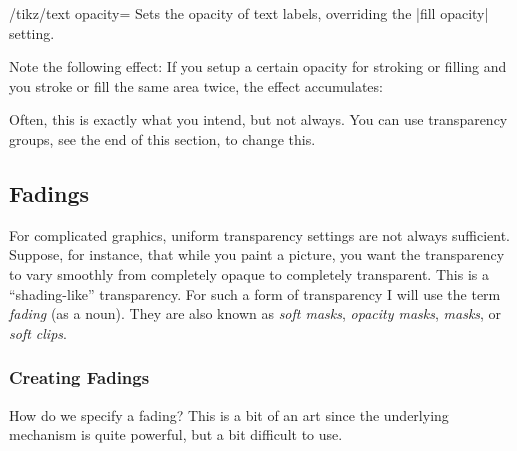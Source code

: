 \begin{key}{/tikz/text opacity=}
  Sets the opacity of text labels, overriding the |fill opacity| setting. 
\begin{codeexample}[]
\end{codeexample}
\end{key}


Note the following effect: If you setup a certain opacity for stroking
or filling and you stroke or fill the same area twice, the effect
accumulates:

\begin{codeexample}[]
\end{codeexample}

Often, this is exactly what you intend, but not always. You can use
transparency groups, see the end of this section, to change this.


\subsection{Fadings}

For complicated graphics, uniform transparency settings are not always
sufficient. Suppose, for instance, that while you paint a picture, you
want the transparency to vary smoothly from completely opaque to
completely transparent. This is a ``shading-like'' transparency. For
such a form of transparency I will use the term \emph{fading} (as a
noun). They are also known as \emph{soft masks}, \emph{opacity masks},
\emph{masks}, or \emph{soft clips}.


\subsubsection{Creating Fadings}

How do we specify a fading? This is a bit of an art since the
underlying mechanism is quite powerful, but a bit difficult to use.

